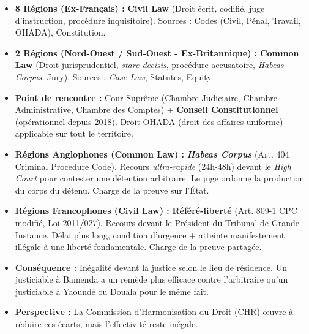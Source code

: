 \documentclass[11pt]{article}
\begin{document}
\begin{aretenir}
\begin{itemize}
    \item \textbf{8 Régions (Ex-Français) :} \textbf{Civil Law} (Droit écrit, codifié, juge d'instruction, procédure inquisitoire). Sources : Codes (Civil, Pénal, Travail, OHADA), Constitution.
    \item \textbf{2 Régions (Nord-Ouest / Sud-Ouest - Ex-Britannique) :} \textbf{Common Law} (Droit jurisprudentiel, \emph{stare decisis}, procédure accusatoire, \emph{Habeas Corpus}, Jury). Sources : \emph{Case Law}, Statutes, Equity.
    \item \textbf{Point de rencontre :} Cour Suprême (Chambre Judiciaire, Chambre Administrative, Chambre des Comptes) + \textbf{Conseil Constitutionnel} (opérationnel depuis 2018). Droit OHADA (droit des affaires uniforme) applicable sur tout le territoire.
\end{itemize}
\end{aretenir}

\begin{savaistu}
\begin{itemize}
    \item \textbf{Régions Anglophones (Common Law) :} \textbf{\emph{Habeas Corpus}} (Art. 404 Criminal Procedure Code). Recours \emph{ultra-rapide} (24h-48h) devant le \emph{High Court} pour contester une détention arbitraire. Le juge ordonne la production du corps du détenu. Charge de la preuve sur l'État.
    \item \textbf{Régions Francophones (Civil Law) :} \textbf{Référé-liberté} (Art. 809-1 CPC modifié, Loi 2011/027). Recours devant le Président du Tribunal de Grande Instance. Délai plus long, condition d'urgence + atteinte manifestement illégale à une liberté fondamentale. Charge de la preuve partagée.
    \item \textbf{Conséquence :} Inégalité devant la justice selon le lieu de résidence. Un justiciable à Bamenda a un remède plus efficace contre l'arbitraire qu'un justiciable à Yaoundé ou Douala pour le même fait.
    \item \textbf{Perspective :} La Commission d'Harmonisation du Droit (CHR) œuvre à réduire ces écarts, mais l'effectivité reste inégale.
\end{itemize}
\end{savaistu}
\end{document}
